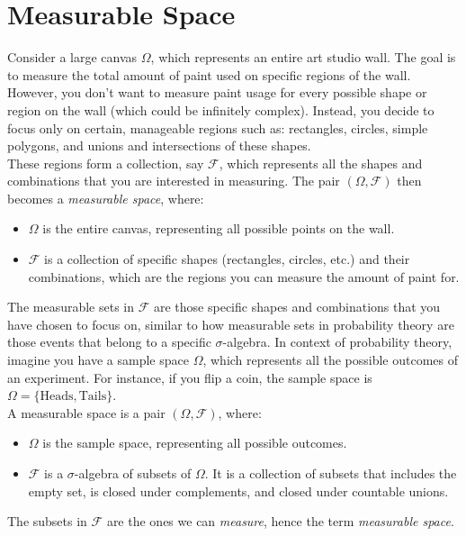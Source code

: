 \section{Measurable Space}


Consider a large canvas $\Omega$, which represents an entire art studio wall. The goal is to measure the total amount of paint used on specific regions of the wall. However, you don't want to measure paint usage for every possible shape or region on the wall (which could be infinitely complex). Instead, you decide to focus only on certain, manageable regions such as: rectangles, circles, simple polygons, and unions and intersections of these shapes.\\

These regions form a collection, say $\mathcal{F}$, which represents all the shapes and combinations that you are interested in measuring. The pair $(\Omega, \mathcal{F})$ then becomes a \textit{measurable space}, where:
\begin{itemize}
    \item $\Omega$ is the entire canvas, representing all possible points on the wall.
    \item $\mathcal{F}$ is a collection of specific shapes (rectangles, circles, etc.) and their combinations, which are the regions you can measure the amount of paint for.
\end{itemize}

The measurable sets in $\mathcal{F}$ are those specific shapes and combinations that you have chosen to focus on, similar to how measurable sets in probability theory are those events that belong to a specific $\sigma$-algebra. In context of probability theory, imagine you have a sample space $\Omega$, which represents all the possible outcomes of an experiment. For instance, if you flip a coin, the sample space is $\Omega = \{\text{Heads}, \text{Tails}\}$.\\

A measurable space is a pair $(\Omega, \mathcal{F})$, where:
\begin{itemize}
    \item $\Omega$ is the sample space, representing all possible outcomes.
    \item $\mathcal{F}$ is a $\sigma$-algebra of subsets of $\Omega$. It is a collection of subsets that includes the empty set, is closed under complements, and closed under countable unions.
\end{itemize}

The subsets in $\mathcal{F}$ are the ones we can \textit{measure}, hence the term \textit{measurable space}.

